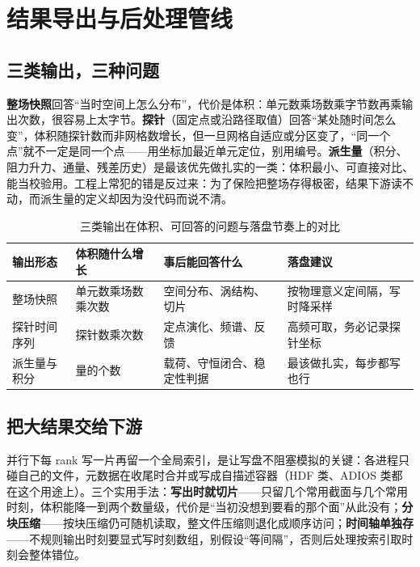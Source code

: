 \documentclass[12pt,a4paper,fontset=fandol]{ctexbook}
\begin{document}
\section{结果导出与后处理管线}
\label{sec:ch08-postprocess}

\subsection*{三类输出，三种问题}

\textbf{整场快照}回答``当时空间上怎么分布''，代价是体积：单元数乘场数乘字节数再乘输出次数，很容易上太字节。\textbf{探针}（固定点或沿路径取值）回答``某处随时间怎么变''，体积随探针数而非网格数增长，但一旦网格自适应或分区变了，``同一个点''就不一定是同一个点——用坐标加最近单元定位，别用编号。\textbf{派生量}（积分、阻力升力、通量、残差历史）是最该优先做扎实的一类：体积最小、可直接对比、能当校验用。工程上常犯的错是反过来：为了保险把整场存得极密，结果下游读不动，而派生量的定义却因为没代码而说不清。

\begin{table}[htbp]
\centering
{\small
\begin{tabular}{%
 >{\raggedright\arraybackslash}p{}
 >{\raggedright\arraybackslash}p{}
 >{\raggedright\arraybackslash}p{}
 >{\raggedright\arraybackslash}p{}}
\toprule
输出形态 & 体积随什么增长 & 事后能回答什么 & 落盘建议 \\
\midrule
整场快照 & 单元数乘场数乘次数 & 空间分布、涡结构、切片 & 按物理意义定间隔，写时降采样 \\
探针时间序列 & 探针数乘次数 & 定点演化、频谱、反馈 & 高频可取，务必记录探针坐标 \\
派生量与积分 & 量的个数 & 载荷、守恒闭合、稳定性判据 & 最该做扎实，每步都写也行 \\
\bottomrule
\end{tabular}
}
\caption{三类输出在体积、可回答的问题与落盘节奏上的对比}
\label{tab:ch08-output}
\end{table}

\subsection*{把大结果交给下游}

并行下每 rank 写一片再留一个全局索引，是让写盘不阻塞模拟的关键：各进程只碰自己的文件，元数据在收尾时合并或写成自描述容器（HDF 类、ADIOS 类都在这个用途上）。三个实用手法：\textbf{写出时就切片}——只留几个常用截面与几个常用时刻，体积能降一到两个数量级，代价是``当初没想到要看的那个面''从此没有；\textbf{分块压缩}——按块压缩仍可随机读取，整文件压缩则退化成顺序访问；\textbf{时间轴单独存}——不规则输出时刻要显式写时刻数组，别假设``等间隔''，否则后处理按索引取时刻会整体错位。
\end{document}
